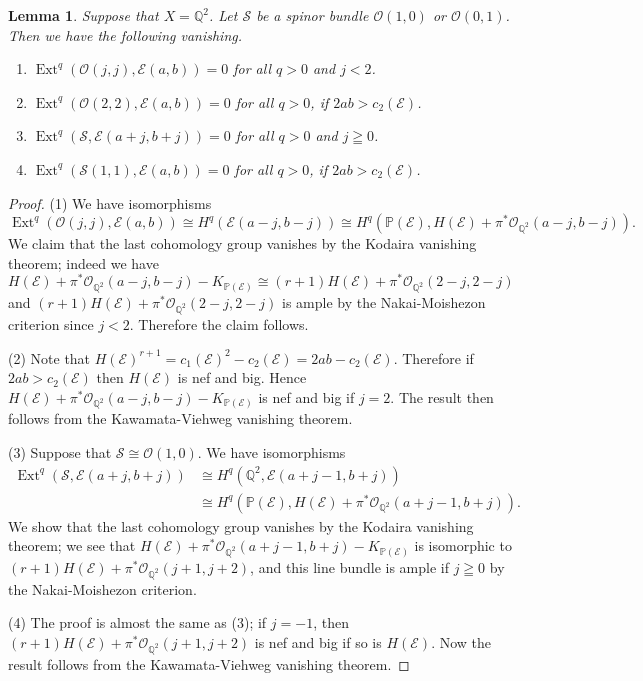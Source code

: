 \documentclass[a4paper,12pt]{amsart}
\newtheorem{lemma}[thm]{Lemma}%
\DeclareMathOperator{\Ext}{Ext}
\begin{document}
\begin{lemma}\label{KodairaOnQuadricSurf}
Suppose that $X=\mathbb{Q}^2$.
Let $\mathcal{S}$ be a 
spinor bundle $\mathcal{O}(1,0)$ or $\mathcal{O}(0,1)$.
Then we have the following vanishing.
\begin{enumerate}
\item[(1)] $\Ext^q(\mathcal{O}(j,j), \mathcal{E}(a,b))=0$ for all $q>0$ and $j< 2$.
\item[(2)] $\Ext^q(\mathcal{O}(2,2), \mathcal{E}(a,b))=0$ for all $q>0$, if $2ab>c_2(\mathcal{E})$.
\item[(3)] $\Ext^q(\mathcal{S},\mathcal{E}(a+j,b+j))=0$ for all $q>0$ and $j\geqq 0$.
\item[(4)] $\Ext^q(\mathcal{S}(1,1),\mathcal{E}(a,b))=0$ for all $q>0$, if $2ab>c_2(\mathcal{E})$.
\end{enumerate}
\end{lemma}
\begin{proof}
(1) We have isomorphisms 
\[\Ext^q(\mathcal{O}(j,j),\mathcal{E}(a,b))
\cong H^q(\mathcal{E}(a-j,b-j))
\cong H^q(\mathbb{P}(\mathcal{E}), H(\mathcal{E})+\pi^*\mathcal{O}_{\mathbb{Q}^2}(a-j,b-j)).\]
We claim that the last cohomology group vanishes by the Kodaira vanishing theorem;
indeed we have 
\[H(\mathcal{E})+\pi^*\mathcal{O}_{\mathbb{Q}^2}(a-j,b-j)-K_{\mathbb{P}(\mathcal{E})}
\cong (r+1)H(\mathcal{E})+\pi^*\mathcal{O}_{\mathbb{Q}^2}(2-j,2-j)\]
and $(r+1)H(\mathcal{E})+\pi^*\mathcal{O}_{\mathbb{Q}^2}(2-j,2-j)$ is ample by the Nakai-Moishezon criterion since $j<2$.
Therefore the claim follows.

(2) Note that $H(\mathcal{E})^{r+1}=c_1(\mathcal{E})^2-c_2(\mathcal{E})=2ab-c_2(\mathcal{E})$.
Therefore if $2ab>c_2(\mathcal{E})$ then $H(\mathcal{E})$ is nef and big.
Hence $H(\mathcal{E})+\pi^*\mathcal{O}_{\mathbb{Q}^2}(a-j,b-j)-K_{\mathbb{P}(\mathcal{E})}$ is nef and big if $j=2$.
The result then follows from the Kawamata-Viehweg vanishing theorem.

(3) 
Suppose that $\mathcal{S}\cong \mathcal{O}(1,0)$.
We have isomorphisms 
\[\begin{split}
\Ext^q(\mathcal{S},\mathcal{E}(a+j,b+j))&\cong 
H^q(\mathbb{Q}^2, \mathcal{E}(a+j-1,b+j))\\
&\cong
H^q(\mathbb{P}(\mathcal{E}), H(\mathcal{E})
+
\pi^*\mathcal{O}_{\mathbb{Q}^2}(a+j-1,b+j)).
\end{split}\]
We show that the last cohomology group vanishes by the Kodaira vanishing theorem;
we see that $H(\mathcal{E})+
\pi^*\mathcal{O}_{\mathbb{Q}^2}(a+j-1,b+j)-K_{\mathbb{P}(\mathcal{E})}
$ is isomorphic to 
$(r+1)H(\mathcal{E})+
\pi^*\mathcal{O}_{\mathbb{Q}^2}(j+1,j+2)$,
and this line bundle is ample if $j\geqq 0$ by the Nakai-Moishezon criterion.

(4) The proof is almost the same as (3); if $j=-1$, then 
$(r+1)H(\mathcal{E})+
\pi^*\mathcal{O}_{\mathbb{Q}^2}(j+1,j+2)$ is nef and big if so is $H(\mathcal{E})$. 
Now the result follows from the Kawamata-Viehweg vanishing theorem.
\end{proof}
\end{document}
